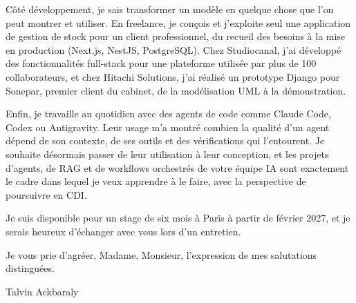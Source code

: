 \documentclass[11pt, a4paper]{extarticle}
\begin{document}
Côté développement, je sais transformer un modèle en quelque chose que l'on peut montrer et
utiliser. En freelance, je conçois et j'exploite seul une application de gestion de stock pour un
client professionnel, du recueil des besoins à la mise en production (Next.js, NestJS,
PostgreSQL). Chez Studiocanal, j'ai développé des fonctionnalités full-stack pour une plateforme
utilisée par plus de 100 collaborateurs, et chez Hitachi Solutions, j'ai réalisé un prototype Django
pour Sonepar, premier client du cabinet, de la modélisation UML à la démonstration.

Enfin, je travaille au quotidien avec des agents de code comme Claude Code, Codex ou Antigravity.
Leur usage m'a montré combien la qualité d'un agent dépend de son contexte, de ses outils et des
vérifications qui l'entourent. Je souhaite désormais passer de leur utilisation à leur conception,
et les projets d'agents, de RAG et de workflows orchestrés de votre équipe IA sont exactement le
cadre dans lequel je veux apprendre à le faire, avec la perspective de poursuivre en CDI.

Je suis disponible pour un stage de six mois à Paris à partir de février 2027, et je serais
heureux d'échanger avec vous lors d'un entretien.

\vspace{4pt}
Je vous prie d'agréer, Madame, Monsieur, l'expression de mes salutations distinguées.

\vspace{10pt}
\hfill Talvin Ackbaraly\hspace*{1cm}
\end{document}
